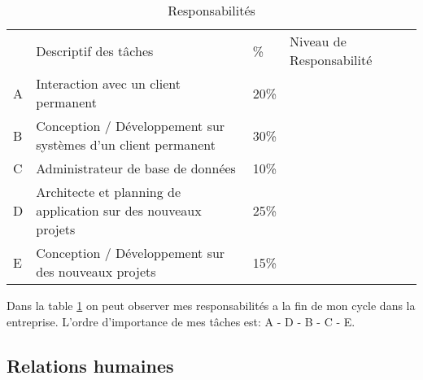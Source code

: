 \documentclass{resume} %
\begin{document}
\newcommand{\uno}{\ding{172}\ }
\newcommand{\dos}{\ding{173}\ }
\newcommand{\tres}{\ding{174}\ }
\newcommand{\cuatro}{\ding{175}\ }

\newcommand{\UNO}{\ding{202}\ }
\newcommand{\DOS}{\ding{203}\ }
\newcommand{\TRES}{\ding{204}\ }
\newcommand{\CUATRO}{\ding{205}\ }


\begin{table}[!htbp]
\label{table-aufiero}
\begin{tabular}{|l|l|l|l|l}
\cline{1-4}
   & Descriptif des tâches &  \% & Niveau de Responsabilité \footnotemark &  \\ \cline{1-4}
 A& Interaction avec un client permanent & 20\% & \uno \dos \tres \CUATRO &  \\ \cline{1-4}
 B& Conception / Développement sur systèmes d'un client permanent & 30\%&  \uno \dos \tres \CUATRO &  \\ \cline{1-4}
 C& Administrateur de base de données  & 10\%  & \uno \dos \TRES \cuatro  &  \\ \cline{1-4}
 D& Architecte et planning de application sur des nouveaux projets & 25\% & \uno \dos \TRES \cuatro &  \\ \cline{1-4}
 E& Conception / Développement sur des nouveaux projets & 15\% &\uno \DOS \tres \cuatro&  \\ \cline{1-4}
\end{tabular}

\caption{Responsabilités}
\end{table}
Dans la table \ref{table-aufiero} on peut observer mes responsabilités  a la fin de mon cycle dans la entreprise.
L'ordre d'importance de mes tâches est: A - D - B - C - E. 


\subsection{Relations humaines} 
\end{document}
